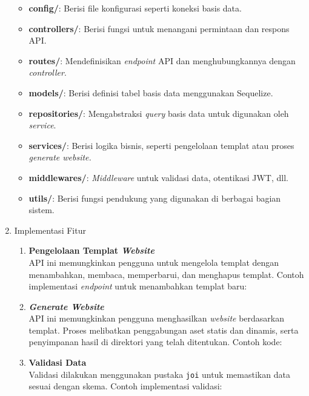 \begin{enumerate}[label*=\arabic*.,ref=\arabic*]
        \begin{itemize}
            \item \textbf{config/}: Berisi file konfigurasi seperti koneksi basis data.
            \item \textbf{controllers/}: Berisi fungsi untuk menangani permintaan dan respons API.
            \item \textbf{routes/}: Mendefinisikan \textit{endpoint} API dan menghubungkannya dengan \textit{controller}.
            \item \textbf{models/}: Berisi definisi tabel basis data menggunakan Sequelize.
            \item \textbf{repositories/}: Mengabstraksi \textit{query} basis data untuk digunakan oleh \textit{service}.
            \item \textbf{services/}: Berisi logika bisnis, seperti pengelolaan templat atau proses \textit{generate website.}
            \item \textbf{middlewares/}: \textit{Middleware} untuk validasi data, otentikasi JWT, dll.
            \item \textbf{utils/}: Berisi fungsi pendukung yang digunakan di berbagai bagian sistem.
        \end{itemize}

        
    \item Implementasi Fitur
        \begin{enumerate}[label=\alph*.]
            \item \textbf{Pengelolaan Templat \textit{Website}}\\
            API ini memungkinkan pengguna untuk mengelola templat dengan menambahkan, membaca, memperbarui, dan menghapus templat. Contoh implementasi \textit{endpoint} untuk menambahkan templat baru:
            

            \item \textbf{\textit{Generate Website}}\\
            API ini memungkinkan pengguna menghasilkan \textit{website} berdasarkan templat. Proses melibatkan penggabungan aset statis dan dinamis, serta penyimpanan hasil di direktori yang telah ditentukan. Contoh kode:
            

            \item \textbf{Validasi Data}\\
            Validasi dilakukan menggunakan pustaka \texttt{joi} untuk memastikan data sesuai dengan skema. Contoh implementasi validasi:
           
        \end{enumerate}
        
\end{enumerate}